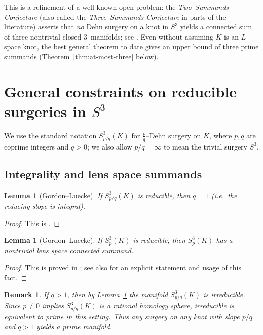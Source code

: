 \documentclass[11pt]{amsart}
\newtheorem{lemma}[theorem]{Lemma}
\newtheorem{remark}[theorem]{Remark}
\numberwithin{equation}{section}
\begin{document}
This is a refinement of a well-known open problem: the \emph{Two--Summands Conjecture} (also called the
\emph{Three--Summands Conjecture} in parts of the literature) asserts that \emph{no} Dehn surgery on a knot
in $S^3$ yields a connected sum of three nontrivial closed $3$--manifolds; see \cite[Conjecture~1]{How10}.
Even without assuming $K$ is an $L$--space knot, the best general theorem to date gives an upper bound of
three prime summands (Theorem~\ref{thm:at-most-three} below).

\section{General constraints on reducible surgeries in $S^3$}

We use the standard notation $S^3_{p/q}(K)$ for $\tfrac{p}{q}$--Dehn surgery on $K$, where $p,q$ are coprime
integers and $q>0$; we also allow $p/q=\infty$ to mean the trivial surgery $S^3$.

\subsection{Integrality and lens space summands}

\begin{lemma}[Gordon--Luecke]\label{lem:integral}
If $S^3_{p/q}(K)$ is reducible, then $q=1$ (i.e.\ the reducing slope is integral).
\end{lemma}

\begin{proof}
This is \cite[Theorem]{GL87}.
\end{proof}

\begin{lemma}[Gordon--Luecke]\label{lem:lens-summand}
If $S^3_p(K)$ is reducible, then $S^3_p(K)$ has a nontrivial lens space connected summand.
\end{lemma}

\begin{proof}
This is proved in \cite{GL89}; see also \cite[\S1]{HLZ15} for an explicit statement and usage of this fact.
\end{proof}

\begin{remark}\label{rem:nonintegral-prime}
If $q>1$, then by Lemma~\ref{lem:integral} the manifold $S^3_{p/q}(K)$ is irreducible.  Since $p\neq 0$
implies $S^3_{p/q}(K)$ is a rational homology sphere, irreducible is equivalent to prime in this setting.
Thus \emph{any} surgery on \emph{any} knot with slope $p/q$ and $q>1$ yields a prime manifold.
\end{remark}
\end{document}
